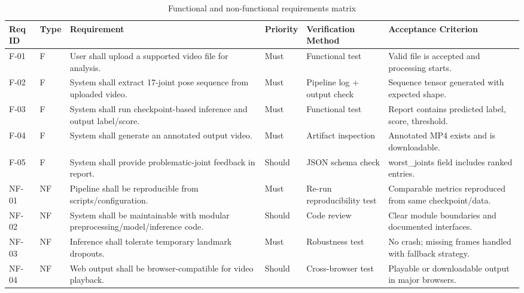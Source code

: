\begin{table}[H]
\centering
\small
\setlength{\tabcolsep}{4pt}
\renewcommand{\arraystretch}{1.12}
\begin{tabularx}{\textwidth}{|>{\centering\arraybackslash}p{1.2cm}|>{\centering\arraybackslash}p{0.9cm}|>{\raggedright\arraybackslash}X|>{\centering\arraybackslash}p{1.4cm}|>{\raggedright\arraybackslash}p{2.5cm}|>{\raggedright\arraybackslash}X|}
\hline
Req ID & Type & Requirement & Priority & Verification Method & Acceptance Criterion \\
\hline
F-01 & F & User shall upload a supported video file for analysis. & Must & Functional test & Valid file is accepted and processing starts. \\
F-02 & F & System shall extract 17-joint pose sequence from uploaded video. & Must & Pipeline log + output check & Sequence tensor generated with expected shape. \\
F-03 & F & System shall run checkpoint-based inference and output label/score. & Must & Functional test & Report contains predicted label, score, threshold. \\
F-04 & F & System shall generate an annotated output video. & Must & Artifact inspection & Annotated MP4 exists and is downloadable. \\
F-05 & F & System shall provide problematic-joint feedback in report. & Should & JSON schema check & worst\_joints field includes ranked entries. \\
NF-01 & NF & Pipeline shall be reproducible from scripts/configuration. & Must & Re-run reproducibility test & Comparable metrics reproduced from same checkpoint/data. \\
NF-02 & NF & System shall be maintainable with modular preprocessing/model/inference code. & Should & Code review & Clear module boundaries and documented interfaces. \\
NF-03 & NF & Inference shall tolerate temporary landmark dropouts. & Must & Robustness test & No crash; missing frames handled with fallback strategy. \\
NF-04 & NF & Web output shall be browser-compatible for video playback. & Should & Cross-browser test & Playable or downloadable output in major browsers. \\
\hline
\end{tabularx}
\caption{Functional and non-functional requirements matrix}
\label{tab:T5}
\end{table}